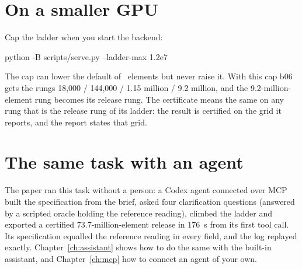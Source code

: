 \section{On a smaller GPU}\label{sec:qs-small}
Cap the ladder when you start the backend:
\begin{shell}
python -B scripts/serve.py --ladder-max 1.2e7
\end{shell}
The cap can lower the default of \LadderMax\ elements but never raise it. With this cap b06 gets the rungs 18,000 /
144,000 / 1.15 million / 9.2 million, and the 9.2-million-element rung becomes its release rung. The certificate means
the same on any rung that is the release rung of its ladder: the result is certified on the grid it reports, and the
report states that grid.

\section{The same task with an agent}
The paper ran this task without a person: a Codex agent connected over MCP built the specification from the brief,
asked four clarification questions (answered by a scripted oracle holding the reference reading), climbed the ladder and
exported a certified 73.7-million-element release in 176~s from its first tool call. Its specification equalled the
reference reading in every field, and the log replayed exactly. Chapter~\ref{ch:assistant} shows how to do the same with
the built-in assistant, and Chapter~\ref{ch:mcp} how to connect an agent of your own.
